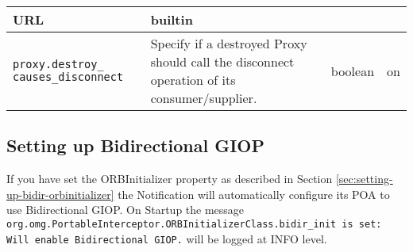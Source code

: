 \begin{small}
\begin{longtable}{|p{5cm}|p{7.5cm}|p{1.5cm}|p{1.5cm}|}
    URL & builtin \\ \hline

    \verb"proxy.destroy_"
    \verb"causes_disconnect" &

    Specify if a destroyed Proxy should call the disconnect operation
    of its consumer/supplier. &

    boolean & on \\ \hline

 

  \end{longtable}
\end{small}

\subsection{Setting up Bidirectional GIOP}

If you have set the ORBInitializer property as described in Section \ref{sec:setting-up-bidir-orbinitializer} 
the Notification will automatically configure its POA to use Bidirectional GIOP.
On Startup the message \texttt{org.omg.PortableInterceptor.ORBInitializerClass.bidir_init is set: Will enable Bidirectional GIOP.} will be logged at INFO level.

